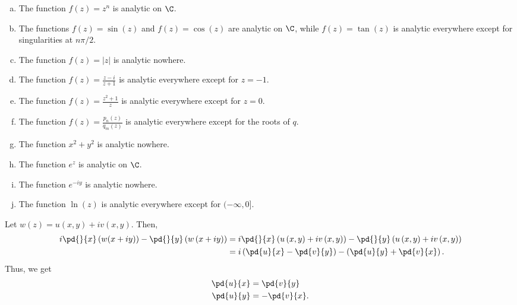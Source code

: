 \documentclass[10pt]{mypackage}
\begin{document}
\RaggedRight
\renewcommand{\arraystretch}{1.5}
\begin{solution}[18.1]\hfill
  \begin{enumerate}[(a)]
    \item The function $f(z) = z^n$ is analytic on $\C$.
    \item The functions $f(z) = \sin(z)$ and $f(z) = \cos(z)$ are analytic on $\C$, while $f(z)= \tan(z)$ is analytic everywhere except for singularities at $n\pi/2$.
    \item The function $f(z) = \left\vert z \right\vert$ is analytic nowhere.
    \item The function $f(z) = \frac{z-i}{z+1}$ is analytic everywhere except for $z = -1$.
    \item The function $f(z) = \frac{z^2 + 1}{z}$ is analytic everywhere except for $z = 0$.
    \item The function $f(z) = \frac{p_n(z)}{q_m(z)}$ is analytic everywhere except for the roots of $q$.
    \item The function $x^2 + y^2$ is analytic nowhere.
    \item The function $e^z$ is analytic on $\C$.
    \item The function $e^{-iy}$ is analytic nowhere.
    \item The function $\ln\left(z\right)$ is analytic everywhere except for $(-\infty,0]$.
  \end{enumerate}
\end{solution}
\begin{solution}[18.2]
  Let $w(z) = u\left(x,y\right) + iv\left(x,y\right)$. Then,
  \begin{align*}
    i\pd{}{x}\left(w(x + iy)\right) - \pd{}{y}\left(w\left(x+ iy\right)\right) &= i \pd{}{x}\left(u\left(x,y\right) + iv\left(x,y\right)\right) - \pd{}{y}\left(u\left(x,y\right) + iv\left(x,y\right)\right)\\
                                                                               &= i\left(\pd{u}{x} - \pd{v}{y}\right) - \left(\pd{u}{y} + \pd{v}{x}\right).
  \end{align*}
  Thus, we get
  \begin{align*}
    \pd{u}{x} &= \pd{v}{y}\\
    \pd{u}{y} &= -\pd{v}{x}.
  \end{align*}
\end{solution}
\end{document}
